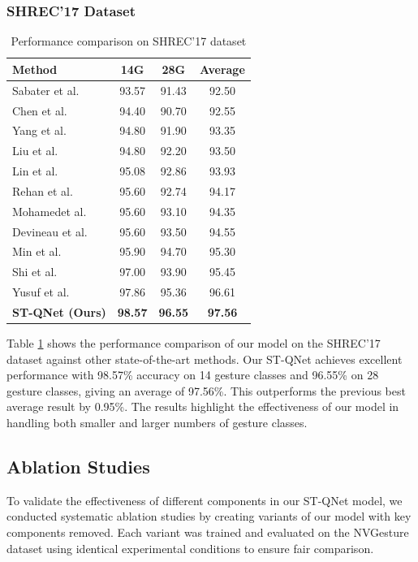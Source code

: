 \documentclass[journal]{IEEEtran}
\theoremstyle{plain}
\begin{document}
\subsubsection{SHREC'17 Dataset}
\begin{table}[ht]
\centering
\caption{Performance comparison on SHREC'17 dataset}
\label{tab:shrec-comparison}
\small
\begin{tabular}{@{}p{3.5cm}ccc@{}}
\hline
\textbf{Method} & \textbf{14G} & \textbf{28G} & \textbf{Average} \\
\hline
Sabater et al. \cite{sabater2021domainviewpointagnostichand} & 93.57 & 91.43 & 92.50 \\
Chen et al. \cite{chen2019constructdynamicgraphshand} & 94.40 & 90.70 & 92.55 \\
Yang et al. \cite{yang2020makeskeletonbasedactionrecognition} & 94.80 & 91.90 & 93.35 \\
Liu et al. \cite{Liu_2020_CVPR} & 94.80 & 92.20 & 93.50 \\
Lin et al. \cite{liu2021hanefficienthierarchicalselfattention} & 95.08 & 92.86 & 93.93 \\
Rehan et al. \cite{10.1145/3549555.3549591} & 95.60 & 92.74 & 94.17 \\
Mohamedet al. \cite{10.1145/3505688.3505690} & 95.60 & 93.10 & 94.35 \\
Devineau et al. \cite{https://doi.org/10.1002/adfm.202003619} & 95.60 & 93.50 & 94.55 \\
Min et al. \cite{min_CVPR2020_PointLSTM} & 95.90 & 94.70 & 95.30 \\
Shi et al. \cite{shi2020decoupledspatialtemporalattentionnetwork} & 97.00 & 93.90 & 95.45 \\
Yusuf et al. \cite{yusuf2024realtimehandgesturerecognition} & 97.86 & 95.36 & 96.61 \\
\hline
\textbf{ST-QNet (Ours)} & \textbf{98.57} & \textbf{96.55} & \textbf{97.56} \\
\hline
\end{tabular}
\end{table}
Table \ref{tab:shrec-comparison} shows the performance comparison of our model on the SHREC'17 dataset against other state-of-the-art methods.
Our ST-QNet achieves excellent performance with 98.57\% accuracy on 14 gesture classes and 96.55\% on 28 gesture classes, giving an average of 97.56\%. This outperforms the previous best average result by 0.95\%. The results highlight the effectiveness of our model in handling both smaller and larger numbers of gesture classes.
\subsection{Ablation Studies}\label{sec:ablation}
To validate the effectiveness of different components in our ST-QNet model, we conducted systematic ablation studies by creating variants of our model with key components removed. Each variant was trained and evaluated on the NVGesture dataset using identical experimental conditions to ensure fair comparison.
\end{document}
